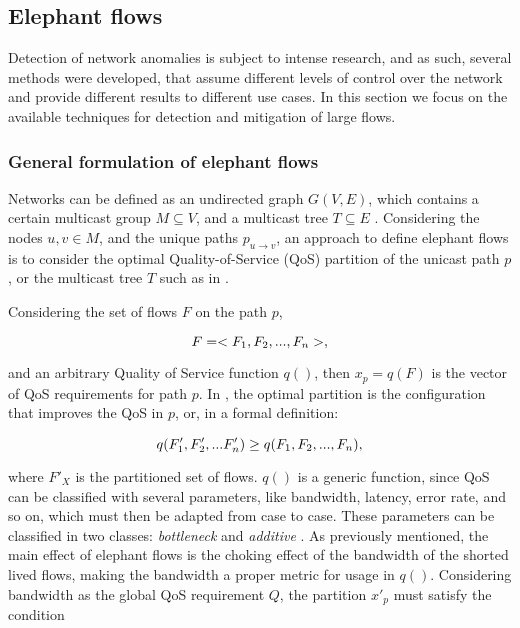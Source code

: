 \subsection {Elephant flows}

Detection of network anomalies is subject to intense research, and as such, several methods were developed, that assume different levels of control over the network 
and provide different results to different use cases. In this section we focus on the available techniques for detection and mitigation of large flows.

\subsubsection{General formulation of elephant flows}

Networks can be defined as an undirected graph $G(V, E)$, which contains a certain multicast group $M \subseteq V$, and a multicast tree $T \subseteq E$ 
\cite{lorenz_optimal_2003}. Considering the nodes $u, v \in M$, and the unique paths $p_{u \to v}$, an approach to define elephant flows
is to consider the optimal Quality-of-Service (QoS) partition of the unicast path $p$, or the multicast tree $T$ such as in 
\cite{lorenz_optimal_2003, lorenz_optimal_2002}. 

\par Considering the set of flows $F$ on the path $p$,

\begin{equation*}
    \centering
    F = <F_1, F_2, ..., F_n>,
\end{equation*}

\par and an arbitrary Quality of Service function $q()$, then $x_p = q(F)$ is the vector of QoS requirements 
for path $p$. In \cite{ros-giralt_mathematical_2017}, the optimal partition is the configuration that improves the QoS in $p$, or, in a formal
definition:

\begin{equation*}
    \centering
    q(F'_1, F'_2, ... F'_n) \geq q(F_1, F_2, ..., F_n),
\end{equation*}

\par where $F'_{X}$ is the partitioned set of flows. $q()$ is a generic function, since QoS can be classified with several parameters, like bandwidth, latency,
error rate, and so on, which must then be adapted from case to case. These parameters can be classified in two classes: \textit{bottleneck} and \textit{additive} 
\cite{lorenz_optimal_2003}. As previously mentioned, the main effect of elephant flows is the choking effect of the bandwidth
of the shorted lived flows, making the bandwidth a proper metric for usage in $q()$. Considering bandwidth as the global QoS requirement $Q$, the partition $x'_p$ 
must satisfy the condition

